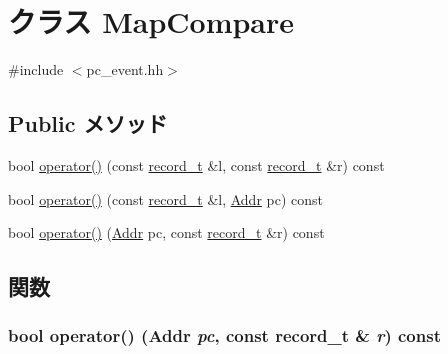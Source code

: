 \hypertarget{classPCEventQueue_1_1MapCompare}{
\section{クラス MapCompare}
\label{classPCEventQueue_1_1MapCompare}
}


{\ttfamily \#include $<$pc\_\-event.hh$>$}\subsection*{Public メソッド}
\begin{DoxyCompactItemize}
\item 
bool \hyperlink{classPCEventQueue_1_1MapCompare_a26358b61edb47a8028684f18bfd18428}{operator()} (const \hyperlink{classPCEvent}{record\_\-t} \&l, const \hyperlink{classPCEvent}{record\_\-t} \&r) const 
\item 
bool \hyperlink{classPCEventQueue_1_1MapCompare_a631c2cc07abd3f3ad605ef899b76d9c4}{operator()} (const \hyperlink{classPCEvent}{record\_\-t} \&l, \hyperlink{base_2types_8hh_af1bb03d6a4ee096394a6749f0a169232}{Addr} pc) const 
\item 
bool \hyperlink{classPCEventQueue_1_1MapCompare_a53bdbb6b25cba5ec2240d23e769409c2}{operator()} (\hyperlink{base_2types_8hh_af1bb03d6a4ee096394a6749f0a169232}{Addr} pc, const \hyperlink{classPCEvent}{record\_\-t} \&r) const 
\end{DoxyCompactItemize}


\subsection{関数}
\hypertarget{classPCEventQueue_1_1MapCompare_a53bdbb6b25cba5ec2240d23e769409c2}{
\subsubsection[{operator()}]{\setlength{\rightskip}{0pt plus 5cm}bool operator() ({\bf Addr} {\em pc}, \/  const {\bf record\_\-t} \& {\em r}) const}}
\label{classPCEventQueue_1_1MapCompare_a53bdbb6b25cba5ec2240d23e769409c2}



